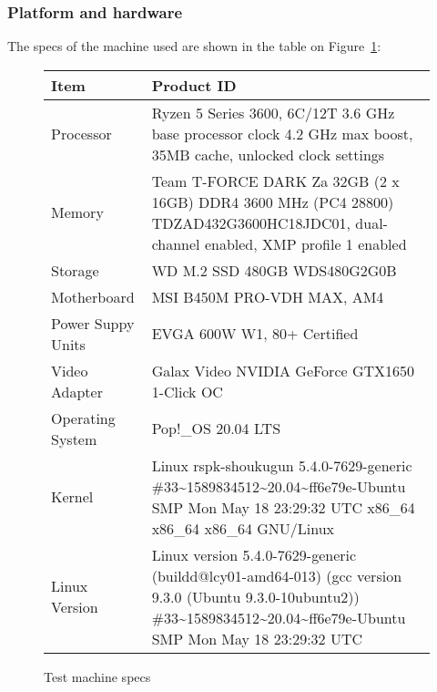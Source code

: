 \subsubsection{Platform and hardware}
The specs of the machine used are shown in the table on Figure~\ref{TABLE:SPECS}:



\begin{figure}[!ht]
    \centering
    \begin{tabularx}{\linewidth}{|l|X|}
        \hline
        Item & Product ID \\
        \hline
        Processor  & Ryzen 5 Series 3600, 6C/12T 3.6 GHz base processor clock 4.2 GHz max boost, 35MB cache, unlocked clock settings \\
        \hline
        Memory  & Team T-FORCE DARK Za 32GB (2 x 16GB) DDR4 3600 MHz (PC4 28800) TDZAD432G3600HC18JDC01, dual-channel enabled, XMP profile 1 enabled\\
        \hline
        Storage  & WD M.2 SSD 480GB WDS480G2G0B \\
        \hline
        Motherboard  & MSI B450M PRO-VDH MAX, AM4 \\
        \hline
        Power Suppy Units  & EVGA 600W W1, 80+ Certified\\
        \hline
        Video Adapter  &  Galax Video NVIDIA GeForce GTX1650 1-Click OC  \\
        \hline
        Operating System  &  Pop!\_OS 20.04 LTS  \\
        \hline
        Kernel  &  Linux rspk-shoukugun 5.4.0-7629-generic \#33\~{}1589834512\~{}20.04\~{}ff6e79e-Ubuntu SMP Mon May 18 23:29:32 UTC  x86\_64 x86\_64 x86\_64 GNU/Linux\\
        \hline
        Linux Version  & Linux version 5.4.0-7629-generic (buildd@lcy01-amd64-013) (gcc version 9.3.0 (Ubuntu 9.3.0-10ubuntu2)) \#33\~{}1589834512\~{}20.04\~{}ff6e79e-Ubuntu SMP Mon May 18 23:29:32 UTC \\ 
        \hline
    \end{tabularx}    
    \caption{Test machine specs}
    \label{TABLE:SPECS}
\end{figure}
